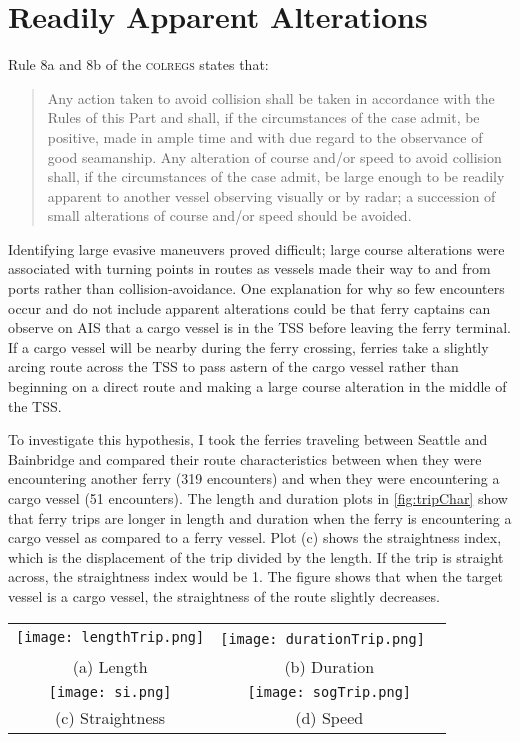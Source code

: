 \documentclass[twoside,symmetric,notoc]{tufte-book}
\begin{document}
\section{Readily Apparent Alterations}
\par{Rule 8a and 8b of the \textsc{colregs} states that:
\begin{quotation}
Any action taken to avoid collision shall be taken in accordance with the Rules of this Part and shall, if the circumstances of the case admit, be positive, made in ample time and with due regard to the observance of good seamanship. Any alteration of course and/or speed to avoid collision shall, if the circumstances of the case admit, be large enough to be readily apparent to another vessel observing visually or by radar; a succession of small alterations of course and/or speed should be avoided.
\end{quotation}
Identifying large evasive maneuvers proved difficult; large course alterations were associated with turning points in routes as vessels made their way to and from ports rather than collision-avoidance. One explanation for why so few encounters occur and do not include apparent alterations could be that ferry captains can observe on AIS that a cargo vessel is in the TSS before leaving the ferry terminal. If a cargo vessel will be nearby during the ferry crossing, ferries take a slightly arcing route across the TSS to pass astern of the cargo vessel rather than beginning on a direct route and making a large course alteration in the middle of the TSS.
}
\par{%
To investigate this hypothesis, I took the ferries traveling between Seattle and Bainbridge and compared their route characteristics between when they were encountering another ferry (319 encounters) and when they were encountering a cargo vessel (51 encounters). The length and duration plots in \ref{fig:tripChar} show that ferry trips are longer in length and duration when the ferry is encountering a cargo vessel as compared to a ferry vessel. Plot (c) shows the straightness index, which is the displacement of the trip divided by the length. If the trip is straight across, the straightness index would be 1. The figure shows that when the target vessel is a cargo vessel, the straightness of the route slightly decreases.
}
\begin{figure*}
\begin{tabular}{cc}
  \texttt{[image: lengthTrip.png]}&   
  \texttt{[image: durationTrip.png]} \ \\
(a) Length & (b) Duration \\[6pt]
 \texttt{[image: si.png]} &  
 \texttt{[image: sogTrip.png]} \\
(c) Straightness & (d) Speed \\[6pt]
\end{tabular}
\caption{Most vessels keep to the traffic separation schemes; ferries have the most cross-TSS traffic.}
\label{fig:tripChar}
\forcerectofloat
\end{figure*}
\end{document}
